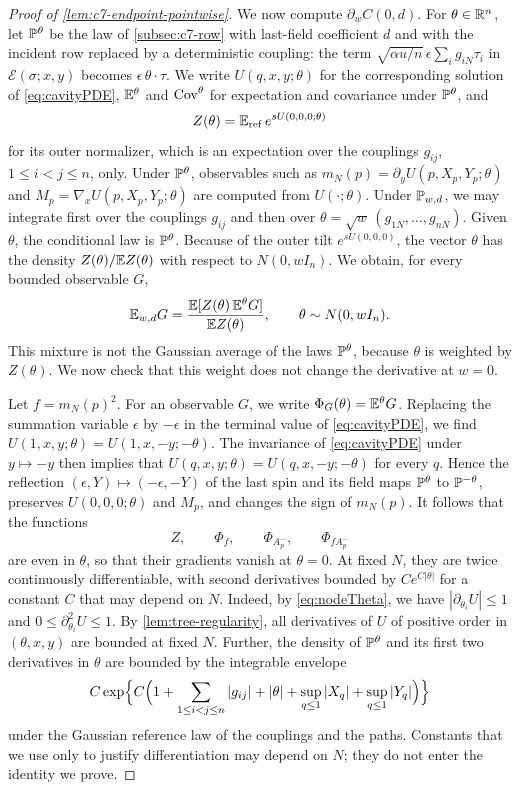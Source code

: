 \begin{proof}[Proof of \cref{lem:c7-endpoint-pointwise}]
We now compute $\partial_wC(0,d)$. For $\theta\in\mathbb R^n$, let
$\mathbb P^\theta$ be the law of \cref{subsec:c7-row} with last-field
coefficient $d$ and with the incident row replaced by a deterministic
coupling: the term $\sqrt{\alpha u/n}\,\epsilon\sum_ig_{iN}\tau_i$ in
$\mathcal E(\sigma;x,y)$ becomes $\epsilon\,\theta\cdot\tau$. We write
$U(q,x,y;\theta)$ for the corresponding solution of
\eqref{eq:cavityPDE}, $\mathbb E^\theta$ and $\operatorname{Cov}^\theta$ for expectation and
covariance under $\mathbb P^\theta$, and
\[
 Z(\theta)=\mathbb E_{\rm ref}\,e^{sU(0,0,0;\theta)}
\]
for its outer normalizer, which is an expectation over the couplings
$g_{ij}$, $1\le i<j\le n$, only. Under $\mathbb P^\theta$, observables such
as $m_N(p)=\partial_yU(p,X_p,Y_p;\theta)$ and
$M_p=\nabla_xU(p,X_p,Y_p;\theta)$ are computed from $U(\cdot;\theta)$.
Under $\mathbb P_{w,d}$, we may integrate first over the couplings $g_{ij}$
and then over $\theta=\sqrt w\,(g_{1N},\dots,g_{nN})$. Given $\theta$,
the conditional law is $\mathbb P^\theta$. Because of the outer tilt
$e^{sU(0,0,0)}$, the vector $\theta$ has the density
$Z(\theta)/\mathbb E Z(\theta)$ with respect to $N(0,wI_n)$. We obtain, for every bounded observable
$G$,
\begin{equation}\label{eq:c7-mixture}
 \mathbb E_{w,d}G=\frac{\mathbb E[Z(\theta)\,\mathbb E^\theta G]}{\mathbb E Z(\theta)},
 \qquad\theta\sim N(0,wI_n).
\end{equation}
This mixture is not the Gaussian average of the laws $\mathbb P^\theta$,
because $\theta$ is weighted by $Z(\theta)$. We now check that this
weight does not change the derivative at $w=0$.

Let $f=m_N(p)^2$. For an observable $G$, we write
$\Phi_G(\theta)=\mathbb E^\theta G$. Replacing the summation variable
$\epsilon$ by $-\epsilon$ in the terminal value of \eqref{eq:cavityPDE},
we find $U(1,x,y;\theta)=U(1,x,-y;-\theta)$. The invariance of
\eqref{eq:cavityPDE} under $y\mapsto-y$ then implies that
$U(q,x,y;\theta)=U(q,x,-y;-\theta)$ for every $q$. Hence the
reflection $(\epsilon,Y)\mapsto(-\epsilon,-Y)$ of the last spin and its
field maps $\mathbb P^\theta$ to $\mathbb P^{-\theta}$, preserves
$U(0,0,0;\theta)$ and $M_p$, and changes the sign of $m_N(p)$. It
follows that the functions
\[
 Z,\qquad \Phi_f,\qquad \Phi_{A_p^-},\qquad \Phi_{fA_p^-}
\]
are even in $\theta$, so that their gradients vanish at $\theta=0$. At
fixed $N$, they are twice continuously differentiable, with second
derivatives bounded by $Ce^{C|\theta|}$ for a constant $C$ that may
depend on $N$. Indeed, by \eqref{eq:nodeTheta}, we have
$|\partial_{\theta_i}U|\le1$ and $0\le\partial_{\theta_i}^2U\le1$. By
\cref{lem:tree-regularity}, all derivatives of $U$ of positive order in
$(\theta,x,y)$ are bounded at fixed $N$. Further, the density of $\mathbb P^\theta$ and its
first two derivatives in $\theta$ are bounded by the integrable
envelope
\[
 C\exp\Bigl\{C\Bigl(1+\sum_{1\le i<j\le n}|g_{ij}|+|\theta|
 +\sup_{q\le1}|X_q|+\sup_{q\le1}|Y_q|\Bigr)\Bigr\}
\]
under the Gaussian reference law of the couplings and the paths.
Constants that we use only to justify differentiation may depend on
$N$; they do not enter the identity we prove.


\end{proof}
